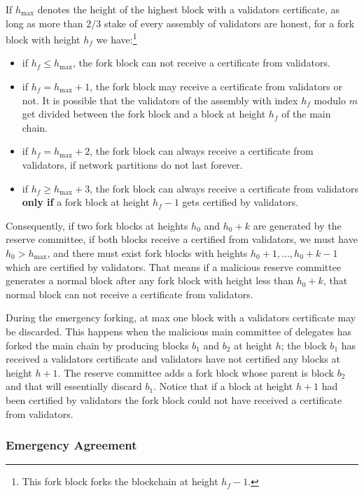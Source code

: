 If $h_{\max}$ denotes the height of the highest block with a validators certificate, as long as more than $2/3$ stake
of every assembly of validators are honest, for a fork block with height $h_f$ we have:\footnote{This fork block
forks the blockchain at height $h_f-1$.}
\begin{itemize}
    \item if $h_f \leq h_{\max}$, the fork block can not receive a certificate from validators.
    \item if $h_f = h_{\max} + 1$, the fork block may receive a certificate from validators or not. It is possible that
    the validators of the assembly with index $h_f$ modulo $m$ get divided between the fork block and a block at
    height $h_f$ of the main chain.
    \item if $h_f = h_{\max} + 2$, the fork block can always receive a certificate from validators, if network
    partitions do not last forever.
    \item if $h_f \geq h_{\max} + 3$, the fork block can always receive a certificate from validators \textbf{only if} a
    fork block at height $h_f-1$ gets certified by validators.
\end{itemize}

Consequently, if two fork blocks at heights $h_0$ and $h_0+k$ are generated by the reserve committee, if both blocks
receive a certified from validators, we must have $h_0 > h_{\max}$, and there must exist fork blocks with heights
$h_0+1,\dots,h_0+k-1$ which are certified by validators. That means if a malicious reserve committee generates a normal
block after any fork block with height less than $h_0+k$, that normal block can not receive a certificate from
validators.

During the emergency forking, at max one block with a validators certificate may be discarded. This happens when
the malicious main committee of delegates has forked the main chain by producing blocks $b_1$ and $b_2$ at height
$h$; the block $b_1$ has received a validators certificate and validators have not certified any blocks at height $h+1$.
The reserve committee adds a fork block whose parent is block $b_2$ and that will essentially discard $b_1$. Notice
that if a block at height $h+1$ had been certified by validators the fork block could not have received a certificate
from validators.

\subsubsection{Emergency Agreement}

